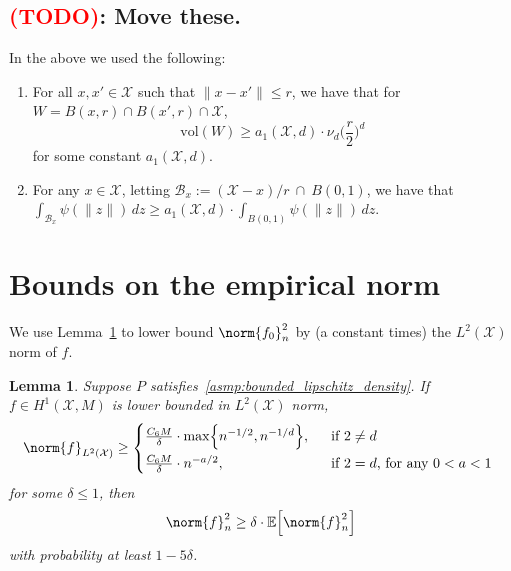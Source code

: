 \documentclass[twoside]{article}
\newcommand{\vol}{\text{vol}}
\newcommand{\1}{\mathbf{1}}
\newcommand{\Xset}{\mathcal{X}}
\newcommand{\Leb}{L}
\newcommand{\mc}[1]{\mathcal{#1}}
\newcommand{\Ebb}{\mathbb{E}}
\newtheorem{lemma}{Lemma}
\theoremstyle{definition}
\theoremstyle{remark}
\begin{document}
\subsection{\textcolor{red}{(TODO)}: Move these.}

In the above we used the following:
\begin{enumerate}[label=(OT\arabic*)]
	\item
	\label{asmp:r_small_1} For all $x,x' \in \Xset$ such that $\|x - x'\| \leq r$, we have that for $W = B(x,r) \cap B(x',r) \cap \Xset$,
	\begin{equation*}
	\vol(W) \geq a_1(\Xset,d) \cdot \nu_d \biggl(\frac{r}{2}\biggr)^d
	\end{equation*}
	for some constant $a_1(\Xset,d)$. 
	\item 
	\label{asmp:r_small_3} For any $x \in \Xset$, letting $\mc{B}_x:= (\Xset - x)/r~ \cap~B(0,1)$, we have that $\int_{\mc{B}_x} \psi(\|z\|) \,dz \geq a_1(\Xset,d) \cdot \int_{B(0,1)} \psi(\|z\|) \,dz$.
\end{enumerate}

\section{Bounds on the empirical norm}
\label{sec:empirical_norm}

We use Lemma~\ref{lem:empirical_norm_sobolev} to lower bound $\norm{f_0}_n^2$ by (a constant times) the $\Leb^2(\Xset)$ norm of $f$.

\begin{lemma}
	\label{lem:empirical_norm_sobolev}
	Suppose $P$ satisfies~\ref{asmp:bounded_lipschitz_density}. If $f \in H^1(\Xset,M)$ is lower bounded in $\Leb^2(\Xset)$ norm,
	\begin{equation}
	\label{eqn:empirical_norm_sobolev_1}
	\norm{f}_{\Leb^2(\Xset)} \geq 
	\begin{cases*}
	\frac{C_6 M}{\delta} \cdot \max\Bigl\{n^{-1/2},n^{-1/d}\Bigr\},& ~~\textrm{if $2 \neq d$} \\
	\frac{C_6 M}{\delta} \cdot n^{-a/2},& ~~\textrm{if $2 = d$, for any $0 < a < 1$}
	\end{cases*}
	\end{equation}
	for some $\delta \leq 1$, then
	\begin{equation}
	\label{eqn:empirical_norm_sobolev}
	\norm{f}_n^2 \geq \delta \cdot \Ebb\Bigl[\norm{f}_n^2\Bigr] 
	\end{equation}
	with probability at least $1 - 5 \delta$.
\end{lemma}
\end{document}
